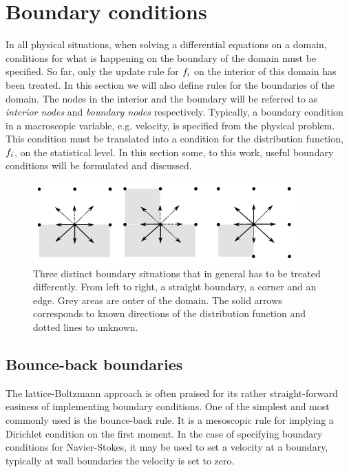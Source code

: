\section{Boundary conditions}\label{sec:lbm:bound}
In all physical situations, when solving a differential equations on a
domain, conditions for what is happening on the boundary of the domain
must be specified. So far, only the update rule for $f_i$ on the
interior of this domain has been treated. In this section we will
also define rules for the boundaries of the domain. The nodes in the
interior and the boundary will be referred to as \emph{interior nodes}
and \emph{boundary nodes} respectively. Typically, a boundary
condition in a macroscopic variable, e.g. velocity, is specified from
the physical problem. This condition must be translated into a
condition for the distribution function, $f_i$, on the statistical
level. In this section some, to this work, useful boundary conditions
will be formulated and discussed.

\begin{figure}
\begin{center}
\includegraphics[width=0.9\textwidth]{fig/bb.pdf}
\end{center}
\caption[Three different boundary situations in the LBM.]{Three
  distinct boundary situations that in general has to be treated
  differently. From left to right, a straight boundary, a corner and
  an edge. Grey areas are outer of the domain. The solid arrows
  corresponds to known directions of the distribution function and
  dotted lines to unknown.}
\label{fig:lbm:bounds}
\end{figure}

\subsection{Bounce-back boundaries}\label{sec:lbm:bb}
The lattice-Boltzmann approach is often praised for its rather
straight-forward easiness of implementing boundary conditions. One of
the simplest and most commonly used is the bounce-back rule. It is a
mesoscopic rule for implying a Dirichlet condition on the first
moment. In the case of specifying boundary conditions for
Navier-Stokes, it may be used to set a velocity at a boundary,
typically at wall boundaries the velocity is set to zero.


